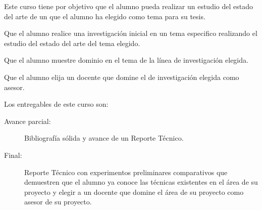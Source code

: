 \begin{syllabus}


\begin{justification}
Este curso tiene por objetivo que el alumno pueda realizar un estudio del estado del arte de un que el alumno ha elegido como tema para su tesis.
\end{justification}

\begin{goals}
\item Que el alumno realice una investigación inicial en un tema especifico realizando el estudio del estado del arte del tema elegido.
\item Que el alumno muestre dominio en el tema de la línea de investigación elegida.
\item Que el alumno elija un docente que domine el de investigación elegida como asesor. 
\item Los entregables de este curso son:
	\begin{description}
		\item [Avance parcial:] Bibliografía sólida y avance de un Reporte Técnico.
		\item [Final:] Reporte Técnico con experimentos preliminares comparativos que demuestren que el alumno ya conoce las técnicas existentes en el área de su proyecto y elegir a un docente que domine el área de su proyecto como asesor de su proyecto.
	\end{description}
\end{goals}

\begin{outcomes}
\item {}
\item {}
\item {}
\item {}
\item {}
\item {}
\item {}
\item {}
\end{outcomes}

\begin{competences}
\item {} 
\item {}
\item {}
\end{competences}


\end{syllabus}
